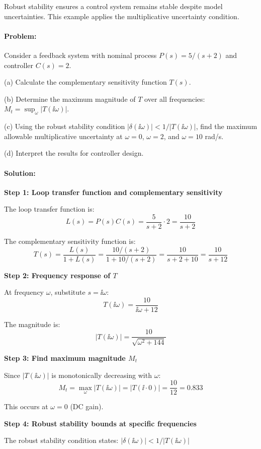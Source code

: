 \documentclass[11pt,a4paper]{article}
\begin{document}
Robust stability ensures a control system remains stable despite model uncertainties. This example applies the multiplicative uncertainty condition.

\paragraph{Problem:}
Consider a feedback system with nominal process $P(s) = 5/(s+2)$ and controller $C(s) = 2$. 

(a) Calculate the complementary sensitivity function $T(s)$.

(b) Determine the maximum magnitude of $T$ over all frequencies: $M_t = \sup_\omega |T(\ii\omega)|$.

(c) Using the robust stability condition $|\delta(\ii\omega)| < 1/|T(\ii\omega)|$, find the maximum allowable multiplicative uncertainty at $\omega = 0$, $\omega = 2$, and $\omega = 10$ rad/s.

(d) Interpret the results for controller design.

\paragraph{Solution:}

\textbf{Step 1: Loop transfer function and complementary sensitivity}

The loop transfer function is:
\[
L(s) = P(s)C(s) = \frac{5}{s+2} \cdot 2 = \frac{10}{s+2}
\]

The complementary sensitivity function is:
\[
T(s) = \frac{L(s)}{1 + L(s)} = \frac{10/(s+2)}{1 + 10/(s+2)} = \frac{10}{s+2+10} = \frac{10}{s+12}
\]

\textbf{Step 2: Frequency response of $T$}

At frequency $\omega$, substitute $s = \ii\omega$:
\[
T(\ii\omega) = \frac{10}{\ii\omega + 12}
\]

The magnitude is:
\[
|T(\ii\omega)| = \frac{10}{\sqrt{\omega^2 + 144}}
\]

\textbf{Step 3: Find maximum magnitude $M_t$}

Since $|T(\ii\omega)|$ is monotonically decreasing with $\omega$:
\[
M_t = \max_\omega |T(\ii\omega)| = |T(\ii \cdot 0)| = \frac{10}{12} = 0.833
\]

This occurs at $\omega = 0$ (DC gain).

\textbf{Step 4: Robust stability bounds at specific frequencies}

The robust stability condition states: $|\delta(\ii\omega)| < 1/|T(\ii\omega)|$
\end{document}
